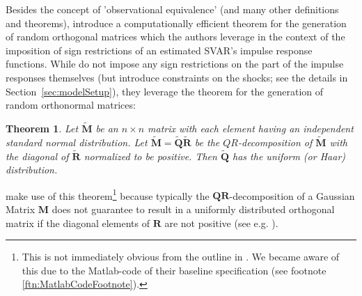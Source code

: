 \documentclass[a4paper,11pt,listof=nochaptergap,oneside,pointednumbers,bibtotoc,bigheadings,liststotoc,hidelinks]{scrbook}
\theoremstyle{mysatz}
\theoremstyle{mydefinition}
\theoremstyle{mytheorem}
\newtheorem{theo}[satz]{Theorem}
\theoremstyle{mybemerkung}
\newcommand{\vect}[1]{\boldsymbol{\mathbf{#1}}}
\begin{document}
Besides the concept of 'observational equivalence' (and many other definitions and theorems), \citet{rubioetal:10} introduce a computationally efficient theorem for the generation of random orthogonal matrices which the authors leverage in the context of the imposition of sign restrictions of an estimated SVAR's impulse response functions. While \citet{ludvigsonetal:18} do not impose any sign restrictions on the part of the impulse responses themselves (but introduce constraints on the shocks; see the details in Section~\ref{sec:modelSetup}), they leverage the theorem for the generation of random orthonormal matrices:

\begin{theo}
Let $\widetilde{\vect{M}}$ be an $n\times n$ matrix with each element having an independent standard normal distribution. Let $\widetilde{\vect{M}} = \widetilde{\vect{Q}}\widetilde{\vect{R}}$ be the $QR$-decomposition of $\widetilde{\vect{M}}$ with the diagonal of $\widetilde{\vect{R}}$ normalized to be positive. Then $\widetilde{\vect{Q}}$ has the uniform (or Haar) distribution.
\end{theo}

\citep{ludvigsonetal:18,ludvigsonetal:19} make use of this theorem\footnote{This is not immediately obvious from the outline in \citet{ludvigsonetal:18}. We became aware of this due to the Matlab-code of their baseline specification (see footnote \ref{ftn:MatlabCodeFootnote}).} because typically the $\vect{QR}$-decomposition of a Gaussian Matrix $\vect{M}$ does not guarantee to result in a uniformly distributed orthogonal matrix if the diagonal elements of $\vect{R}$ are not positive (see e.g. \citealp{edelman:05}).
\end{document}
